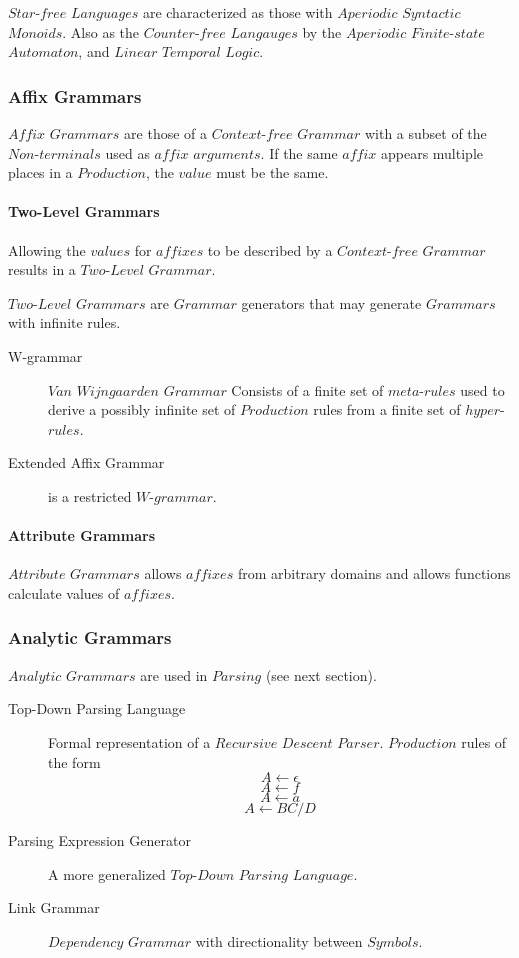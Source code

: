 \documentclass{article}
\begin{document}
$Star$-$free$ $Languages$ are characterized as those with $Aperiodic$
$Syntactic$ $Monoids$. Also as the $Counter$-$free$ $Langauges$ by the
$Aperiodic$ $Finite$-$state$ $Automaton$, and $Linear$ $Temporal$
$Logic$.

\subsubsection{Affix Grammars}

$Affix$ $Grammars$ are those of a $Context$-$free$ $Grammar$ with a
subset of the $Non$-$terminals$ used as $affix$ $arguments$. If the
same $affix$ appears multiple places in a $Production$, the $value$
must be the same.

\paragraph{Two-Level Grammars}
Allowing the $values$ for $affixes$ to be described by a
$Context$-$free$ $Grammar$ results in a $Two$-$Level$ $Grammar$.

$Two$-$Level$ $Grammars$ are $Grammar$ generators that may generate
$Grammars$ with infinite rules.

\begin{description}
\item[W-grammar] $Van$ $Wijngaarden$ $Grammar$ Consists of a finite
  set of $meta$-$rules$ used to derive a possibly infinite set of
  $Production$ rules from a finite set of $hyper$-$rules$.
\item[Extended Affix Grammar] is a restricted $W$-$grammar$.
\end{description}

\paragraph{Attribute Grammars}
$Attribute$ $Grammars$ allows $affixes$ from arbitrary domains and
allows functions calculate values of $affixes$.

\subsubsection{Analytic Grammars}

$Analytic$ $Grammars$ are used in $Parsing$ (see next section).

\begin{description}
\item[Top-Down Parsing Language] Formal representation of a
  $Recursive$ $Descent$ $Parser$. $Production$ rules of the form
\[
    A \leftarrow \epsilon
\]\[
    A \leftarrow f
\]\[
    A \leftarrow a
\]\[
    A \leftarrow BC/D
\]
\item[Parsing Expression Generator]
A more generalized $Top$-$Down$ $Parsing$ $Language$.
\item[Link Grammar]
$Dependency$ $Grammar$ with directionality between $Symbols$.
\end{description}
\end{document}
